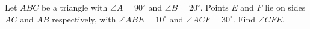 Let $ABC$ be a triangle with $\angle A=90^\circ$ and $\angle B=20^\circ$. Points $E$ and $F$ lie on sides $AC$ and $AB$ respectively, with $\angle ABE=10^\circ$ and $\angle ACF=30^\circ$. Find $\angle CFE$.
